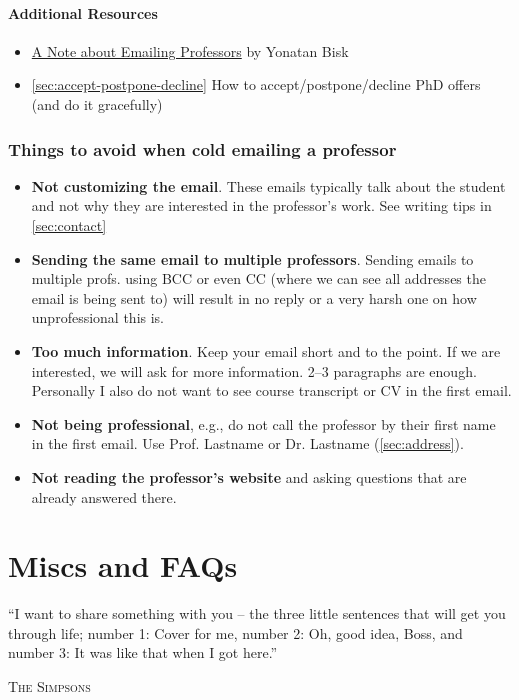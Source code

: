 \documentclass[oneside,11pt,dvipsnames]{book}
\begin{document}
\subsubsection*{Additional Resources}
\begin{itemize}
  \item \href{https://yonatanbisk.com/emailing_professors.html}{A Note about Emailing Professors} by Yonatan Bisk
  \item \autoref{sec:accept-postpone-decline} How to accept/postpone/decline PhD offers (and do it gracefully)
\end{itemize}


\subsection{Things to avoid when cold emailing a professor}

\begin{itemize}
    
    \item \textbf{Not customizing the email}. These emails typically talk about the student and not why they are interested in the professor's work. See writing tips in \autoref{sec:contact}
    \item \textbf{Sending the same email to multiple professors}. Sending emails to multiple profs. using BCC or even CC (where we can see all addresses the email is being sent to) will result in no reply or a very harsh one on how unprofessional this is.
    \item \textbf{Too much information}. Keep your email short and to the point. If we are interested, we will ask for more information. 2--3 paragraphs are enough.  Personally I also do not want to see course transcript or CV in the first email.
    \item \textbf{Not being professional}, e.g., do not call the professor by their first name in the first email.  Use Prof. Lastname or Dr. Lastname (\autoref{sec:address}).
    \item \textbf{Not reading the professor's website} and asking questions that are already answered there.
\end{itemize}

\chapter{Miscs and FAQs}\label{sec:faqs}

\epigraph{``I want to share something with you – the three little sentences that will get you through life; number 1: Cover for me, number 2: Oh, good idea, Boss, and number 3: It was like that when I got here.''}{\textsc{The Simpsons}}
\end{document}

